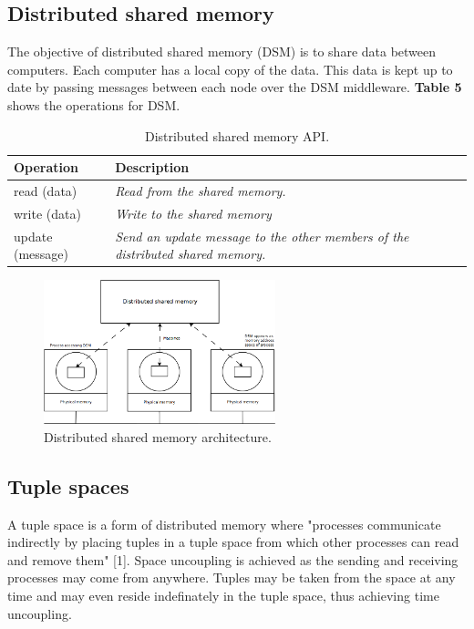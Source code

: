 \subsection{Distributed shared memory}

The objective of distributed shared memory (DSM) is to share data between computers. Each computer has a local copy of the data. This data is kept up to date by passing messages between each node over the DSM middleware. \textbf{Table 5} shows the operations for DSM.

\begin{table}
	\caption{Distributed shared memory API.}
	\label{tab:api:dsm}
	\begin{tabular}{p{150px} | p{250px}}
		\textbf{Operation} & \textbf{Description} \\
		\hline
		read (data) 			& \emph{Read from the shared memory.} \\
		write (data) 			& \emph{Write to the shared memory} \\
		update (message) 	& \emph{Send an update message to the other members of the distributed shared memory.} \\
		\hline
	\end{tabular}
\end{table}


\begin{figure}
	\begin{center}
		\includegraphics[width=0.6\textwidth]{img/dsm}
	\end{center}
	\caption{Distributed shared memory architecture.}
	\label{fig:dsm}
\end{figure}



\subsection{Tuple spaces}

A tuple space is a form of distributed memory where "processes communicate indirectly by placing tuples in a tuple space from which other processes can read and remove them" [1]. Space uncoupling is achieved as the sending and receiving processes may come from anywhere. Tuples may be taken from the space at any time and may even reside indefinately in the tuple space, thus achieving time uncoupling.

